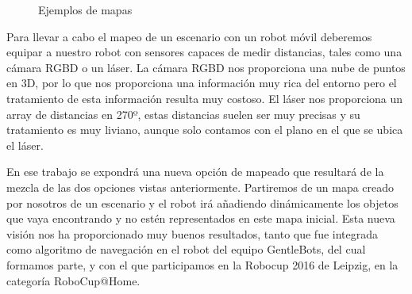 \begin{figure}[hbtp]
  \begin{center}
  \end{center}
  \caption{Ejemplos de mapas}
  \label{fig:maps-ej}
\end{figure}
Para llevar a cabo el mapeo de un escenario con un robot móvil deberemos equipar a nuestro robot con sensores capaces de medir distancias, tales como una cámara RGBD o un láser. La cámara RGBD nos proporciona una nube de puntos en 3D, por lo que nos proporciona una información muy rica del entorno pero el tratamiento de esta información resulta muy costoso. El láser nos proporciona un array de distancias en 270º, estas distancias suelen ser muy precisas y su tratamiento es muy liviano, aunque solo contamos con el plano en el que se ubica el láser. 

En ese trabajo se expondrá una nueva opción de mapeado que resultará de la mezcla de las dos opciones vistas anteriormente. Partiremos de un mapa creado por nosotros de un escenario y el robot irá añadiendo dinámicamente los objetos que vaya encontrando y no estén representados en este mapa inicial. Esta nueva visión nos ha proporcionado muy buenos resultados, tanto que fue integrada como algoritmo de navegación en el robot del equipo GentleBots, del cual formamos parte, y con el que participamos en la Robocup 2016 de Leipzig, en la categoría RoboCup@Home.

